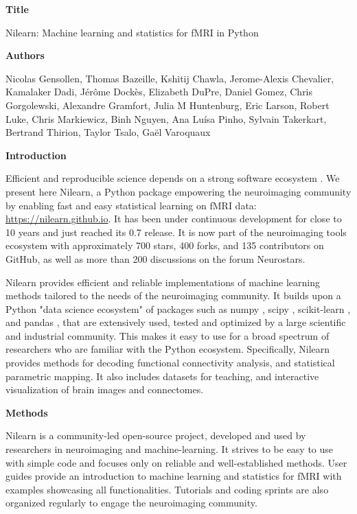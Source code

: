 \documentclass[a4paper]{article}
\begin{document}
\noindent \textbf{Title}

\medskip

\noindent Nilearn: Machine learning and statistics for fMRI in Python

\bigskip

\noindent \textbf{Authors}

\medskip

\noindent Nicolas Gensollen,  Thomas Bazeille, Kshitij Chawla, Jerome-Alexis Chevalier, Kamalaker Dadi, Jérôme Dockès, Elizabeth DuPre, Daniel Gomez, Chris Gorgolewski, Alexandre Gramfort, Julia M Huntenburg, Eric Larson, Robert Luke, Chris Markiewicz, Binh Nguyen, Ana Luísa Pinho, Sylvain Takerkart, Bertrand Thirion, Taylor Tsalo, Gaël Varoquaux

\bigskip

\noindent \textbf{Introduction}

\medskip

\noindent Efficient and reproducible science depends on a strong software ecosystem \cite{Poldrack2019}. We present here Nilearn, a Python package empowering the neuroimaging community by enabling fast and easy statistical learning on fMRI data: \url{https://nilearn.github.io}. It has been under continuous development for close to 10 years and just reached its 0.7 release. It is now part of the neuroimaging tools ecosystem with approximately 700 stars, 400 forks, and 135 contributors on GitHub, as well as more than 200 discussions on the forum Neurostars.

\medskip

\noindent Nilearn provides efficient and reliable implementations of machine learning methods tailored to the needs of the neuroimaging community. It builds upon a Python "data science ecosystem" of packages such as numpy \cite{VanDerWalt2011}, scipy \cite{Oliphant2007}, scikit-learn \cite{Pedregosa2011}, and pandas \cite{McKinney2010}, that are extensively used, tested and optimized by a large scientific and industrial community. This makes it easy to use for a broad spectrum of researchers who are familiar with the Python ecosystem. Specifically, Nilearn provides methods  for decoding functional connectivity analysis, and statistical parametric mapping. It also includes datasets for teaching, and interactive visualization of brain images and connectomes.

\bigskip

\noindent \textbf{Methods}

\medskip

\noindent Nilearn is a community-led open-source project, developed and used by researchers in neuroimaging and machine-learning. It strives to be easy to use with simple code and focuses only on reliable and well-established methods. User guides provide an introduction to machine learning and statistics for fMRI with examples showcasing all functionalities. Tutorials and coding sprints are also organized regularly to engage the neuroimaging community.
\end{document}
